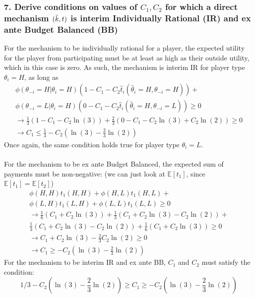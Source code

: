 \documentclass[a4paper]{article}
\begin{document}
	\subsubsection*{7. Derive conditions on values of $C_1,C_2$ for which a direct mechanism $(\Tilde{k},t)$ is interim Individually Rational (IR) and ex ante Budget Balanced (BB)}
	For the mechanism to be individually rational for a player, the expected utility for the player from participating must be at least as high as their outside utility, which in this case is zero. As such, the mechanism is interim IR for player type $\theta_{i}=H$, as long as 
	\begin{align}
		\phi(\theta_{-i}=H|\theta_{i}=H)(1-C_{1}-C_{2}\hat{t}_{i}(\hat{\theta}_{i}=H,\theta_{-i}=H))+\nonumber\\
		\phi(\theta_{-i}=L|\theta_{i}=H)(0-C_{1}-C_{2}\hat{t}_{i}(\hat{\theta}_{i}=H,\theta_{-i}=L)) \geq 0\\
		\rightarrow
		\frac{1}{3}(1-C_{1}-C_{2}\ln(3))+\frac{2}{3}(0-C_{1}-C_{2}\ln(3)+C_{2}\ln(2)) \geq 0\\
		\rightarrow
		C_1\leq\frac{1}{3}-C_2(\ln(3)-\frac{2}{3}\ln(2))
	\end{align}
	Once again, the same condition holds true for player type $\theta_{i}=L$.\\\\
	For the mechanism to be ex ante Budget Balanced, the expected sum of payments must be non-negative: (we can just look at $\mathbb{E}[t_1]$, since $\mathbb{E}[t_1] = \mathbb{E}[t_2]$)
	\begin{align}
		\phi(H,H)t_1(H,H)+\phi(H,L)t_1(H,L)+\nonumber\\
		\phi(L,H)t_1(L,H)+\phi(L,L)t_1(L,L)\geq 0\\
		\rightarrow
		\frac{1}{6}(C_1+C_2\ln(3))+\frac{1}{3}(C_1+C_2\ln(3)-C_2\ln(2))+\nonumber\\
		\frac{1}{3}(C_1+C_2\ln(3)-C_2\ln(2))+\frac{1}{6}(C_1+C_2\ln(3))\geq 0\\
		\rightarrow
		C_1+C_2\ln(3)-\frac{2}{3}C_2\ln(2)\geq 0\\
		\rightarrow
		C_1\geq -C_2(\ln(3)-\frac{2}{3}\ln(2))
	\end{align}
	For the mechanism to be interim IR and ex ante BB, $C_1$ and $C_2$ must satisfy the condition:
	\begin{equation}
		1/3-C_2(\ln(3)-\frac{2}{3}\ln(2))\geq C_1 \geq -C_2(\ln(3)-\frac{2}{3}\ln(2))
	\end{equation}
	
	
\end{document}
